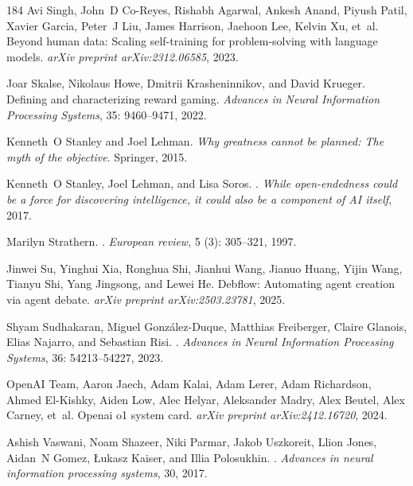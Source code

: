 \begin{thebibliography}{184}
Avi Singh, John~D Co-Reyes, Rishabh Agarwal, Ankesh Anand, Piyush Patil, Xavier
  Garcia, Peter~J Liu, James Harrison, Jaehoon Lee, Kelvin Xu, et~al.
\newblock Beyond human data: Scaling self-training for problem-solving with
  language models.
\newblock \emph{arXiv preprint arXiv:2312.06585}, 2023.

Joar Skalse, Nikolaus Howe, Dmitrii Krasheninnikov, and David Krueger.
\newblock Defining and characterizing reward gaming.
\newblock \emph{Advances in Neural Information Processing Systems},
  35: 9460--9471, 2022.

Kenneth~O Stanley and Joel Lehman.
\newblock \emph{{Why greatness cannot be planned: The myth of the objective}}.
\newblock Springer, 2015.

Kenneth~O Stanley, Joel Lehman, and Lisa Soros.
.
\newblock \emph{While open-endedness could be a force for discovering
  intelligence, it could also be a component of AI itself}, 2017.

Marilyn Strathern.
.
\newblock \emph{European review}, 5 (3): 305--321, 1997.

Jinwei Su, Yinghui Xia, Ronghua Shi, Jianhui Wang, Jianuo Huang, Yijin Wang,
  Tianyu Shi, Yang Jingsong, and Lewei He.
\newblock Debflow: Automating agent creation via agent debate.
\newblock \emph{arXiv preprint arXiv:2503.23781}, 2025.

Shyam Sudhakaran, Miguel Gonz{\'a}lez-Duque, Matthias Freiberger, Claire
  Glanois, Elias Najarro, and Sebastian Risi.
.
\newblock \emph{Advances in Neural Information Processing Systems},
  36: 54213--54227, 2023.

OpenAI Team, Aaron Jaech, Adam Kalai, Adam Lerer, Adam Richardson, Ahmed
  El-Kishky, Aiden Low, Alec Helyar, Aleksander Madry, Alex Beutel, Alex
  Carney, et~al.
\newblock Openai o1 system card.
\newblock \emph{arXiv preprint arXiv:2412.16720}, 2024.

Ashish Vaswani, Noam Shazeer, Niki Parmar, Jakob Uszkoreit, Llion Jones,
  Aidan~N Gomez, {\L}ukasz Kaiser, and Illia Polosukhin.
.
\newblock \emph{Advances in neural information processing systems}, 30, 2017.


\end{thebibliography}
